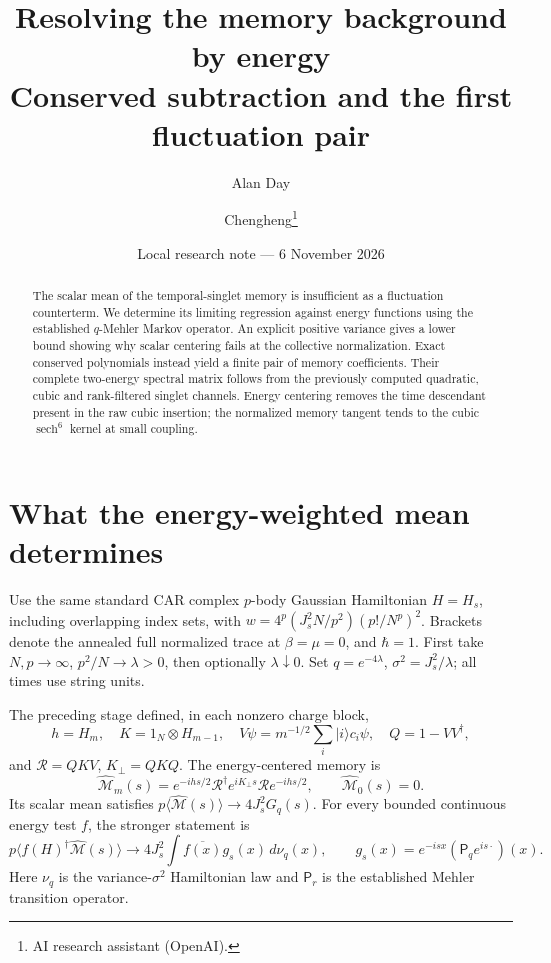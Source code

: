 \documentclass[11pt,a4paper]{article}
\title{Resolving the memory background by energy\\Conserved subtraction and the first fluctuation pair}
\author{Alan Day \and Chengheng\thanks{AI research assistant (OpenAI).}}
\date{Local research note --- 6 November 2026}
\newcommand{\av}[1]{\langle #1\rangle}
\newcommand{\MM}{\widehat{\mathcal M}}
\begin{document}
\maketitle
\begin{abstract}
The scalar mean of the temporal-singlet memory is insufficient as a
fluctuation counterterm. We determine its limiting regression against
energy functions using the established $q$-Mehler Markov operator.
An explicit positive variance gives a lower bound showing why scalar
centering fails at the collective normalization. Exact conserved
polynomials instead yield a finite pair of memory coefficients. Their
complete two-energy spectral matrix follows from the previously
computed quadratic, cubic and rank-filtered singlet channels. Energy
centering removes the time descendant present in the raw cubic
insertion; the normalized memory tangent tends to the cubic
$\operatorname{sech}^6$ kernel at small coupling.
\end{abstract}
\section{What the energy-weighted mean determines}
Use the same standard CAR complex $p$-body Gaussian Hamiltonian
$H=H_s$, including overlapping index sets, with
$w=4^p(J_s^2N/p^2)(p!/N^p)^2$. Brackets denote the annealed full
normalized trace at $\beta=\mu=0$, and $\hbar=1$. First take
$N,p\to\infty$, $p^2/N\to\lambda>0$, then optionally
$\lambda\downarrow0$. Set $q=e^{-4\lambda}$,
$\sigma^2=J_s^2/\lambda$; all times use string units.

The preceding stage defined, in each nonzero charge block,
\begin{equation}
 h=H_m,\quad K=1_N\otimes H_{m-1},\quad
 V\psi=m^{-1/2}\sum_i|i\rangle c_i\psi,\quad Q=1-VV^\dagger,
\end{equation}
and $\mathcal R=QKV$, $K_\perp=QKQ$. The energy-centered memory is
\begin{equation}
 \MM_m(s)=e^{-ihs/2}\mathcal R^\dagger e^{iK_\perp s}
 \mathcal R e^{-ihs/2},\qquad \MM_0(s)=0.
\end{equation}
Its scalar mean satisfies $p\av{\MM(s)}\to4J_s^2G_q(s)$.
For every bounded continuous energy test $f$, the stronger statement is
\begin{equation}\label{eq:regression}
 p\av{f(H)^\dagger\MM(s)}\longrightarrow
 4J_s^2\int\overline{f(x)}g_s(x)\,d\nu_q(x),\qquad
 g_s(x)=e^{-isx}(\mathsf P_q e^{is\cdot})(x).
\end{equation}
Here $\nu_q$ is the variance-$\sigma^2$ Hamiltonian law and
$\mathsf P_r$ is the established Mehler transition operator.
\end{document}
